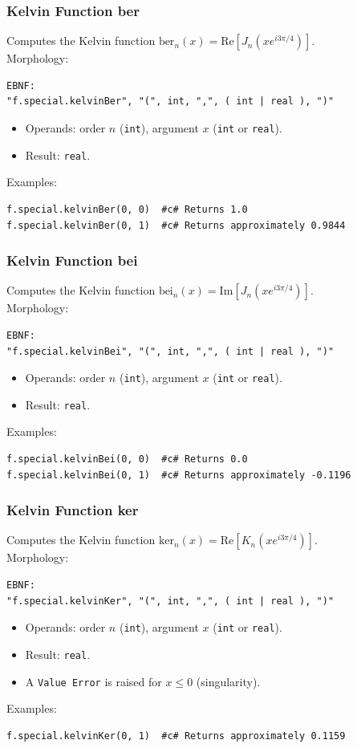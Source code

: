 \subsubsection{Kelvin Function ber}
Computes the Kelvin function $\text{ber}_n(x) = \text{Re}\left[J_n\!\left(x e^{i 3\pi/4}\right)\right]$. \\
Morphology:
\begin{verbatim}
EBNF:
"f.special.kelvinBer", "(", int, ",", ( int | real ), ")"
\end{verbatim}
\begin{itemize}
\item Operands: order $n$ (\texttt{int}), argument $x$ (\texttt{int} or \texttt{real}).
\item Result: \texttt{real}.
\end{itemize}
Examples:
\begin{verbatim}
f.special.kelvinBer(0, 0)  #c# Returns 1.0
f.special.kelvinBer(0, 1)  #c# Returns approximately 0.9844
\end{verbatim}

\subsubsection{Kelvin Function bei}
Computes the Kelvin function $\text{bei}_n(x) = \text{Im}\left[J_n\!\left(x e^{i 3\pi/4}\right)\right]$. \\
Morphology:
\begin{verbatim}
EBNF:
"f.special.kelvinBei", "(", int, ",", ( int | real ), ")"
\end{verbatim}
\begin{itemize}
\item Operands: order $n$ (\texttt{int}), argument $x$ (\texttt{int} or \texttt{real}).
\item Result: \texttt{real}.
\end{itemize}
Examples:
\begin{verbatim}
f.special.kelvinBei(0, 0)  #c# Returns 0.0
f.special.kelvinBei(0, 1)  #c# Returns approximately -0.1196
\end{verbatim}

\subsubsection{Kelvin Function ker}
Computes the Kelvin function $\text{ker}_n(x) = \text{Re}\left[K_n\!\left(x e^{i 3\pi/4}\right)\right]$. \\
Morphology:
\begin{verbatim}
EBNF:
"f.special.kelvinKer", "(", int, ",", ( int | real ), ")"
\end{verbatim}
\begin{itemize}
\item Operands: order $n$ (\texttt{int}), argument $x$ (\texttt{int} or \texttt{real}).
\item Result: \texttt{real}.
\item A \texttt{Value Error} is raised for $x \leq 0$ (singularity).
\end{itemize}
Examples:
\begin{verbatim}
f.special.kelvinKer(0, 1)  #c# Returns approximately 0.1159
\end{verbatim}

